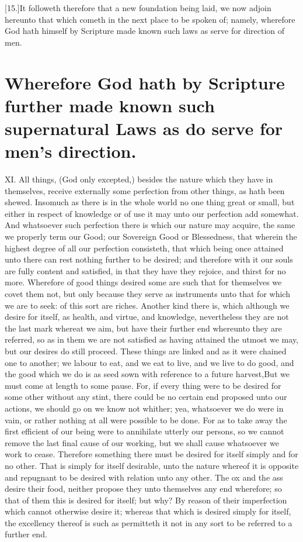 [15.]It followeth therefore that a new foundation being laid, we now adjoin hereunto that which cometh in the next place to be spoken of; namely, wherefore God hath himself by Scripture made known such laws as serve for direction of men.

\section*{Wherefore God hath by Scripture further made known such supernatural Laws as do serve for men’s direction.}

XI. All things, (God only excepted,) besides the nature which they have in themselves, receive externally some perfection from other things, as hath been shewed. Insomuch as there is in the whole world no one thing great or small, but either in respect of knowledge or of use it may unto our perfection add somewhat. And whatsoever such perfection there is which our nature may acquire, the same we properly term our Good; our Sovereign Good or Blessedness, that wherein the highest degree of all our perfection consisteth, that which being once attained unto there can rest nothing further to be desired; and therefore with it our souls are fully content and satisfied, in that they have they rejoice, and thirst for no more. Wherefore of good things desired some are such that for themselves we covet them not, but only because they serve as instruments unto that for which we are  to seek: of this sort are riches. Another kind there is, which although we desire for itself, as health, and virtue, and knowledge, nevertheless they are not the last mark whereat we aim, but have their further end whereunto they are referred, so as in them we are not satisfied as having attained the utmost we may, but our desires do still proceed. These things are linked and as it were chained one to another; we labour to eat, and we eat to live, and we live to do good, and the good which we do is as seed sown with reference to a future harvest,But we must come at length to some pause. For, if every thing were to be desired for some other without any stint, there could be no certain end proposed unto our actions, we should go on we know not whither; yea, whatsoever we do were in vain, or rather nothing at all were possible to be done. For as to take away the first efficient of our being were to annihilate utterly our persons, so we cannot remove the last final cause of our working, but we shall cause whatsoever we work to cease. Therefore something there must be desired for itself simply and for no other. That is simply for itself desirable, unto the nature whereof it is opposite and repugnant to be desired with relation unto any other. The ox and the ass desire their food, neither propose they unto themselves any end wherefore; so that of them this is desired for itself; but why? By reason of their imperfection which cannot otherwise desire it; whereas that which is desired simply for itself, the excellency thereof is such as permitteth it not in any sort to be referred to a further end.

